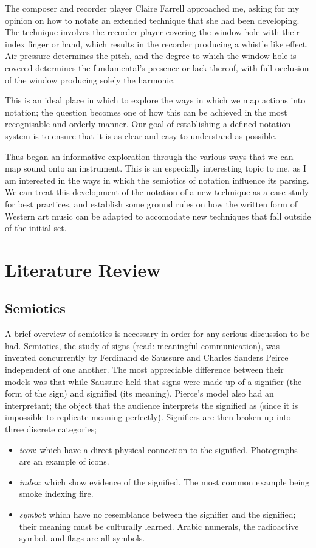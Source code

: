 
The composer and recorder player Claire Farrell approached me, asking for my opinion on how to notate an extended technique that she had been developing. 
The technique involves the recorder player covering the window hole with their index finger or hand, which results in the recorder producing a whistle like effect. 
Air pressure determines the pitch, and the degree to which the window hole is covered determines the fundamental's presence or lack thereof, with full occlusion of the window producing solely the harmonic. 


This is an ideal place in which to explore the ways in which we map actions into notation; the question becomes one of how this can be achieved in the most recognisable and orderly manner. 
Our goal of establishing a defined notation system is to ensure that it is as clear and easy to understand as possible. 


Thus began an informative exploration through the various ways that we can map sound onto an instrument. 
This is an especially interesting topic to me, as I am interested in the ways in which the semiotics of notation influence its parsing. 
We can treat this development of the notation of a new technique as a case study for best practices, and establish some ground rules on how the written form of Western art music can be adapted to accomodate new techniques that fall outside of the initial set.



\section{Literature Review}




\subsection{Semiotics}
A brief overview of semiotics is necessary in order for any serious discussion to be had.
Semiotics, the study of signs (read: meaningful communication), was invented concurrently by Ferdinand de Saussure and Charles Sanders Peirce independent of one another.
The most appreciable difference between their models was that while Saussure held that signs were made up of a signifier (the form of the sign) and signified (its meaning), Pierce's model also had an interpretant; the object that the audience interprets the signified as (since it is impossible to replicate meaning perfectly).
Signifiers are then broken up into three discrete categories; 
\begin{itemize}
    \item \emph{\gls{icon}}: which have a direct physical connection to the signified. Photographs are an example of icons.
    \item \emph{\gls{index}}: which show evidence of the signified. The most common example being smoke indexing fire.
    \item \emph{\gls{symbol}}: which have no resemblance between the signifier and the signified; their meaning must be culturally learned. Arabic numerals, the radioactive symbol, and flags are all symbols.
\end{itemize}

